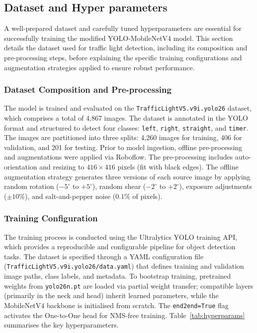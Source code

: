 \subsection{Dataset and Hyper parameters}
\label{sub:datasetYolo}
A well-prepared dataset and carefully tuned hyperparameters are essential for successfully training the modified YOLO-MobileNetV4 model. This section details the dataset used for traffic light detection, including its composition and pre-processing steps, before explaining the specific training configurations and augmentation strategies applied to ensure robust performance.

\subsubsection{Dataset Composition and Pre-processing}
The model is trained and evaluated on the \texttt{TrafficLightV5.v9i.yolo26} dataset, which comprises a total of 4,867 images. The dataset is annotated in the YOLO format and structured to detect four classes: \texttt{left}, \texttt{right}, \texttt{straight}, and \texttt{timer}. The images are partitioned into three splits: 4,260 images for training, 406 for validation, and 201 for testing. Prior to model ingestion, offline pre-processing and augmentations were applied via Roboflow. The pre-processing includes auto-orientation and resizing to $416 \times 416$ pixels (fit with black edges). The offline augmentation strategy generates three versions of each source image by applying random rotation ($-5^\circ$ to $+5^\circ$), random shear ($-2^\circ$ to $+2^\circ$), exposure adjustments ($\pm 10\%$), and salt-and-pepper noise ($0.1\%$ of pixels).

\subsubsection{Training Configuration}
The training process is conducted using the Ultralytics YOLO training API, which provides a reproducible and configurable pipeline for object detection tasks. The dataset is specified through a YAML configuration file (\texttt{TrafficLightV5.v9i.yolo26/data.yaml}) that defines training and validation image paths, class labels, and metadata. To bootstrap training, pretrained weights from \texttt{yolo26n.pt} are loaded via partial weight transfer; compatible layers (primarily in the neck and head) inherit learned parameters, while the MobileNetV4 backbone is initialised from scratch. The \texttt{end2end=True} flag activates the One-to-One head for NMS-free training. Table~\ref{tab:hyperparams} summarises the key hyperparameters.

